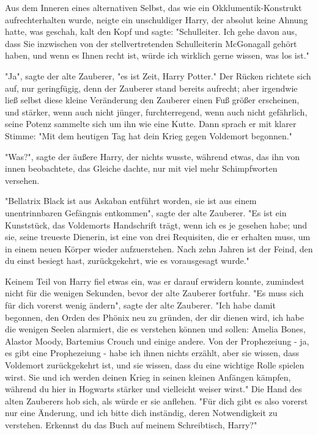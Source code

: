 {Aus dem Inneren eines alternativen Selbst, das wie ein Okklumentik-Konstrukt aufrechterhalten wurde, neigte ein unschuldiger Harry, der absolut keine Ahnung hatte, was geschah, kalt den Kopf und sagte: "Schulleiter. Ich gehe davon aus, dass Sie inzwischen von der stellvertretenden Schulleiterin McGonagall gehört haben, und wenn es Ihnen recht ist, würde ich wirklich gerne wissen, was los ist."

"Ja", sagte der alte Zauberer, "es ist Zeit, Harry Potter." Der Rücken richtete sich auf, nur geringfügig, denn der Zauberer stand bereits aufrecht; aber irgendwie ließ selbst diese kleine Veränderung den Zauberer einen Fuß größer erscheinen, und stärker, wenn auch nicht jünger, furchterregend, wenn auch nicht gefährlich, seine Potenz sammelte sich um ihn wie eine Kutte. Dann sprach er mit klarer Stimme: "Mit dem heutigen Tag hat dein Krieg gegen Voldemort begonnen."

"Was?", sagte der äußere Harry, der nichts wusste, während etwas, das ihn von innen beobachtete, das Gleiche dachte, nur mit viel mehr Schimpfworten versehen.

"Bellatrix Black ist aus Askaban entführt worden, sie ist aus einem unentrinnbaren Gefängnis entkommen", sagte der alte Zauberer. "Es ist ein Kunststück, das Voldemorts Handschrift trägt, wenn ich es je gesehen habe; und sie, seine treueste Dienerin, ist eine von drei Requisiten, die er erhalten muss, um in einem neuen Körper wieder aufzuerstehen. Nach zehn Jahren ist der Feind, den du einst besiegt hast, zurückgekehrt, wie es vorausgesagt wurde."

Keinem Teil von Harry fiel etwas ein, was er darauf erwidern konnte, zumindest nicht für die wenigen Sekunden, bevor der alte Zauberer fortfuhr. "Es muss sich für dich vorerst wenig ändern", sagte der alte Zauberer. "Ich habe damit begonnen, den Orden des Phönix neu zu gründen, der dir dienen wird, ich habe die wenigen Seelen alarmiert, die es verstehen können und sollen: Amelia Bones, Alastor Moody, Bartemius Crouch und einige andere. Von der Prophezeiung - ja, es gibt eine Prophezeiung - habe ich ihnen nichts erzählt, aber sie wissen, dass Voldemort zurückgekehrt ist, und sie wissen, dass du eine wichtige Rolle spielen wirst. Sie und ich werden deinen Krieg in seinen kleinen Anfängen kämpfen, während du hier in Hogwarts stärker und vielleicht weiser wirst." Die Hand des alten Zauberers hob sich, als würde er sie anflehen. "Für dich gibt es also vorerst nur eine Änderung, und ich bitte dich inständig, deren Notwendigkeit zu verstehen. Erkennst du das Buch auf meinem Schreibtisch, Harry?"

}
